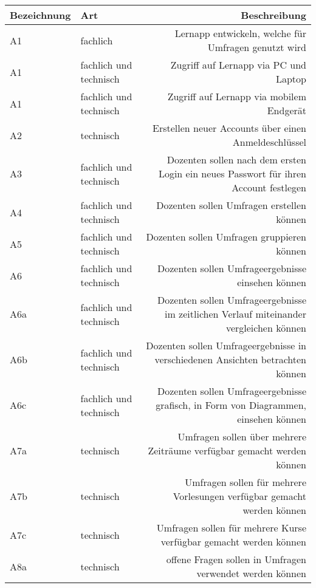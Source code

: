 \begin{table}[!htbp]
    \centering
    \begin{tabularx}{\textwidth}{l|k|r}
      \toprule
      {Bezeichnung} & {Art} & {Beschreibung} \\
      \midrule
      {\label{Anf:A1}A1} & fachlich & Lernapp entwickeln, welche für Umfragen genutzt wird \\
      \hline
      {\label{Anf:A1}A1} & fachlich und technisch & Zugriff auf Lernapp via PC und Laptop \\
      \hline
      {\label{Anf:A1}A1} & fachlich und technisch & Zugriff auf Lernapp via mobilem Endgerät \\
      \hline
      {\label{Anf:A2}A2} & technisch & Erstellen neuer Accounts über einen Anmeldeschlüssel \\
      \hline
      {\label{Anf:A3}A3} & fachlich und technisch & Dozenten sollen nach dem ersten Login ein neues Passwort für ihren Account festlegen \\
      \hline
      {\label{Anf:A4}A4} & fachlich und technisch & Dozenten sollen Umfragen erstellen können\\
      \hline
      {\label{Anf:A5}A5} & fachlich und technisch & Dozenten sollen Umfragen gruppieren können\\
      \hline
      {\label{Anf:A6}A6} & fachlich und technisch & Dozenten sollen Umfrageergebnisse einsehen können\\
      \hline
      {\label{Anf:A6a}A6a} & fachlich und technisch & Dozenten sollen Umfrageergebnisse im zeitlichen Verlauf miteinander vergleichen können\\
      \hline
      {\label{Anf:A6b}A6b} & fachlich und technisch & Dozenten sollen Umfrageergebnisse in verschiedenen Ansichten betrachten können\\
      \hline
      {\label{Anf:A6c}A6c} & fachlich und technisch & Dozenten sollen Umfrageergebnisse grafisch, in Form von Diagrammen, einsehen können\\
      \hline
      {\label{Anf:A7a}A7a} & technisch & Umfragen sollen über mehrere Zeiträume verfügbar gemacht werden können \\
      \hline
      {\label{Anf:A7b}A7b} & technisch & Umfragen sollen für mehrere Vorlesungen verfügbar gemacht werden können \\
      \hline
      {\label{Anf:A7c}A7c} & technisch & Umfragen sollen für mehrere Kurse verfügbar gemacht werden können \\
      \hline
      {\label{Anf:A8a}A8a} & technisch & offene Fragen sollen in Umfragen verwendet werden können \\

\end{tabularx}
\end{table}
